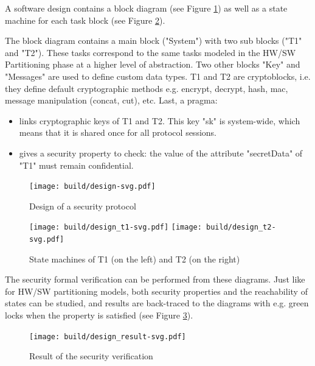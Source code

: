 \documentclass[12pt]{article}
\begin{document}
A software design contains a block diagram (see Figure \ref{fig:design}) as well as a state machine for each task block (see Figure \ref{fig:design_t}). 

The block diagram contains a main block ("System") with two sub blocks ("T1" and "T2"). These tasks correspond to the same tasks modeled in the HW/SW Partitioning phase at a higher level of abstraction. Two other blocks "Key" and "Messages" are used to define custom data types. T1 and T2 are cryptoblocks, i.e. they define default cryptographic methods e.g. encrypt, decrypt, hash, mac, message manipulation (concat, cut), etc. Last, a pragma:
\begin{itemize}
\item links cryptographic keys of T1 and T2. This key "sk" is system-wide, which means that it is shared once for all protocol sessions.
\item gives a security property to check: the value of the attribute "secretData" of "T1" must remain confidential. 
\end{itemize}


\begin{figure}[htbp]
\centering
\texttt{[image: build/design-svg.pdf]}
\caption{Design of a security protocol} \label{fig:design}
\end{figure}

\begin{figure}[htbp]
\centering
\texttt{[image: build/design\_t1-svg.pdf]}\hspace{3cm}
\texttt{[image: build/design\_t2-svg.pdf]}
\caption{State machines of T1 (on the left) and T2 (on the right)} \label{fig:design_t}
\end{figure}

The security formal verification can be performed from these diagrams. Just like for HW/SW partitioning models, both security properties and the reachability of states can be studied, and results are back-traced to the diagrams with e.g. green locks when the property is satisfied (see Figure \ref{fig:design_result}).

\begin{figure}[htbp]
\centering
\texttt{[image: build/design\_result-svg.pdf]}
\caption{Result of the security verification} \label{fig:design_result}
\end{figure}
\end{document}
